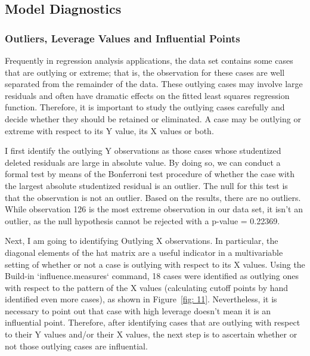 \documentclass{article}
\begin{document}
\subsection{Model Diagnostics}
\subsubsection{Outliers, Leverage Values and Influential Points}
Frequently in regression analysis applications, the data set contains some cases that are outlying or extreme; that is, the observation for these cases are well separated from the remainder of the data. These outlying cases may involve large residuals and often have dramatic effects on the fitted least squares regression function. Therefore, it is important to study the outlying cases carefully and decide whether they should be retained or eliminated. A case may be outlying or extreme with respect to its Y value, its X values or both.

I first identify the outlying Y observations as those cases whose studentized deleted residuals are large in absolute value. By doing so, we can conduct a formal test by means of the Bonferroni test procedure of whether the case with the largest absolute studentized residual is an outlier. The null for this test is that the observation is not an outlier. Based on the results, there are no outliers. While observation 126 is the most extreme observation in our data set, it isn't an outlier, as the null hypothesis cannot be rejected with a p-value = 0.22369. 

Next, I am going to identifying Outlying X observations. In particular, the diagonal elements of the hat matrix are a useful indicator in a multivariable setting of whether or not a case is outlying with respect to its X values. Using the Build-in `influence.measures` command, 18 cases were identified as outlying ones with respect to the pattern of the X values (calculating cutoff points by hand identified even more cases), as shown in Figure~\ref{fig: 11}. Nevertheless, it is necessary to point out that case with high leverage doesn't mean it is an influential point. Therefore, after identifying cases that are outlying with respect to their Y values and/or their X values, the next step is to ascertain whether or not those outlying cases are influential. 
\end{document}
